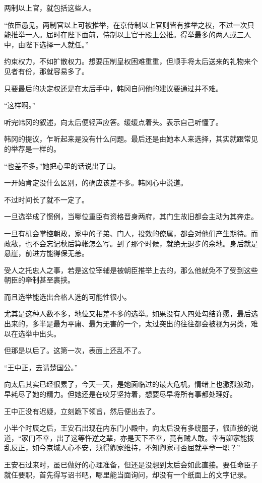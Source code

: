 两制以上官，就包括这些人。

“依臣愚见。两制官以上可被推举，在京侍制以上官则皆有推举之权，不过一次只能推举一人。届时在陛下面前，侍制以上官于殿上公推。得举最多的两人或三人中，由陛下选择一人就任。”

约束权力，不如扩散权力。想要压制皇权困难重重，但顺手将太后送来的礼物来个见者有份，那就容易多了。

只要最后的决定权还是在太后手中，韩冈自问他的建议要通过并不难。

“这样啊。”

听完韩冈的叙述，向太后便轻声应答。缓缓点着头。表示自己听懂了。

韩冈的提议，乍听起来是没有什么问题。最后还是由她本人来选择，其实就跟常见的举荐是一样的。

“也差不多。”她把心里的话说出了口。

一开始肯定没什么区别，的确应该差不多。韩冈心中说道。

不过时间长了就不一定了。

一旦选举成了惯例，当哪位重臣有资格晋身两府，其门生故旧都会主动为其奔走。

一旦有机会掌控朝政，家中的子弟、门人，投效的僚属，都会对他们产生期待。而政敌，也不会忘记秋后算帐怎么写。到了那个时候，就绝无退步的余地。身后就是悬崖，前进方能得保无恙。

受人之托忠人之事，若是这位宰辅是被朝臣推举上去的，那么他就免不了受到这些朝臣的牵制甚至裹挟。

而且选举能选出合格人选的可能性很小。

尤其是这种人数不多，地位又相差不多的选举。如果没有人四处勾结许愿，最后选出来的，多半是最为平庸、最为无害的一个，太过突出的往往都会被视为另类，难以在选举中出头。

但那是以后了。这第一次，表面上还乱不了。

“王中正，去请楚国公。”

向太后其实已经很累了，今天一天，是她面临过的最大危机，情绪上也激烈波动，早耗尽了她的精力。但她还是在咬牙坚持着，想要尽早将所有事都处理好。

王中正没有迟疑，立刻跪下领旨，然后便出去了。

小半个时辰之后，王安石出现在内东门小殿中，向太后没有多绕圈子，很直接的说道，“家门不幸，出了这等忤逆之辈，亦是天下不幸，竟有贼人敢。幸有卿家能拨乱反正，如今京城人心不安，须得卿家维持，不知卿家可否屈就平章一职？”

王安石过来时，虽已做好的心理准备，但还是没想到太后会如此直接。要任命臣子就任要职，首先得写诏书吧，哪里能当面询问，却没有一个纸面上的文字记录。

